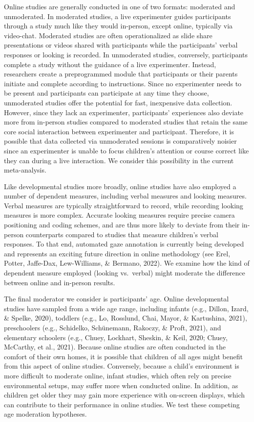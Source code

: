 \documentclass[
  man,floatsintext]{apa6}
\begin{document}
Online studies are generally conducted in one of two formats: moderated and unmoderated. In moderated studies, a live experimenter guides participants through a study much like they would in-person, except online, typically via video-chat. Moderated studies are often operationalized as slide share presentations or videos shared with participants while the participants' verbal responses or looking is recorded. In unmoderated studies, conversely, participants complete a study without the guidance of a live experimenter. Instead, researchers create a preprogrammed module that participants or their parents initiate and complete according to instructions. Since no experimenter needs to be present and participants can participate at any time they choose, unmoderated studies offer the potential for fast, inexpensive data collection. However, since they lack an experimenter, participants' experiences also deviate more from in-person studies compared to moderated studies that retain the same core social interaction between experimenter and participant. Therefore, it is possible that data collected via unmoderated sessions is comparatively noisier since an experimenter is unable to focus children's attention or course correct like they can during a live interaction. We consider this possibility in the current meta-analysis.

Like developmental studies more broadly, online studies have also employed a number of dependent measures, including verbal measures and looking measures. Verbal measures are typically straightforward to record, while recording looking measures is more complex. Accurate looking measures require precise camera positioning and coding schemes, and are thus more likely to deviate from their in-person counterparts compared to studies that measure children's verbal responses. To that end, automated gaze annotation is currently being developed and represents an exciting future direction in online methodology (see Erel, Potter, Jaffe-Dax, Lew-Williams, \& Bermano, 2022). We examine how the kind of dependent measure employed (looking vs.~verbal) might moderate the difference between online and in-person results.

The final moderator we consider is participants' age. Online developmental studies have sampled from a wide age range, including infants (e.g., Dillon, Izard, \& Spelke, 2020), toddlers (e.g., Lo, Rosslund, Chai, Mayor, \& Kartushina, 2021), preschoolers (e.g., Schidelko, Schünemann, Rakoczy, \& Proft, 2021), and elementary schoolers (e.g., Chuey, Lockhart, Sheskin, \& Keil, 2020; Chuey, McCarthy, et al., 2021). Because online studies are often conducted in the comfort of their own homes, it is possible that children of all ages might benefit from this aspect of online studies. Conversely, because a child's environment is more difficult to moderate online, infant studies, which often rely on precise environmental setups, may suffer more when conducted online. In addition, as children get older they may gain more experience with on-screen displays, which can contribute to their performance in online studies. We test these competing age moderation hypotheses.
\end{document}
